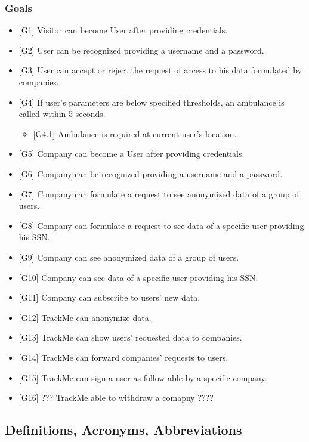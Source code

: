 \documentclass{article}
\begin{document}
\subsubsection{Goals}
\begin{itemize}
	\item {[G1]} Visitor can become User after providing credentials.
	\item {[G2]} User can be recognized providing a username and a password.
	\item {[G3]} User can accept or reject the request of access to his data formulated by companies.
	\item {[G4]} If user's parameters are below specified thresholds, an ambulance is called within 5 seconds. 
	\begin{itemize}
		\item {[G4.1]} Ambulance is required at current user's location. 
	\end{itemize}
	\item {[G5]} Company can become a User after providing credentials. 
	\item {[G6]} Company can be recognized providing a username and a password.
	\item {[G7]} Company can formulate a request to see anonymized data of a group of users.
	\item {[G8]} Company can formulate a request to see data of a specific user providing his SSN.
	\item {[G9]} Company can see anonymized data of a group of users.
	\item {[G10]} Company can see data of a specific user providing his SSN.
	\item {[G11]} Company can subscribe to users' new data.
	\item {[G12]} TrackMe can anonymize data.
	\item {[G13]} TrackMe can show users' requested data to companies.
	\item {[G14]} TrackMe can forward companies' requests to users. 
	\item {[G15]} TrackMe can sign a user as follow-able  by a specific company. 
	\item {[G16]} ??? TrackMe able to withdraw a comapny ????
\end{itemize} 
\subsection{Definitions, Acronyms, Abbreviations}
\end{document}

